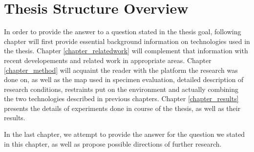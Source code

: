 \section{Thesis Structure Overview}
In order to provide the answer to a question stated in the thesis goal, following chapter will first provide essential background information on technologies used in the thesis. Chapter \ref{chapter_relatedwork} will complement that information with recent developements and related work in appropriate areas. Chapter \ref{chapter_method} will acquaint the reader with the platform the research was done on, as well as the map used in specimen evaluation, detailed description of research conditions, restraints put on the environment and actually combining the two technologies described in previous chapters. Chapter \ref{chapter_results} presents the details of experiments done in course of the thesis, as well as their results.

In the last chapter, we attempt to provide the answer for the question we stated in this chapter, as well as propose possible directions of further research.
